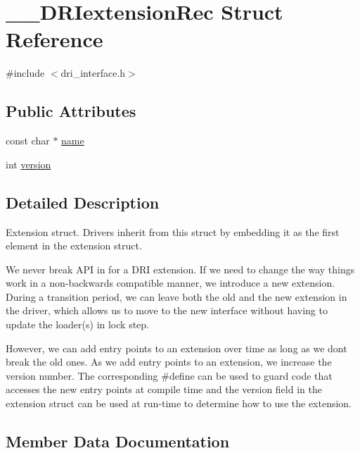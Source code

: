 \hypertarget{struct_____d_r_iextension_rec}{}\section{\+\_\+\+\_\+\+D\+R\+Iextension\+Rec Struct Reference}
\label{struct_____d_r_iextension_rec}


{\ttfamily \#include $<$dri\+\_\+interface.\+h$>$}

\subsection*{Public Attributes}
\begin{DoxyCompactItemize}
\item 
const char $\ast$ \hyperlink{struct_____d_r_iextension_rec_a477dbf3ee1bdd155ef7dda4896bb2540}{name}
\item 
int \hyperlink{struct_____d_r_iextension_rec_a6fa021bb0b66dbc662a4397a21ffa198}{version}
\end{DoxyCompactItemize}


\subsection{Detailed Description}
Extension struct. Drivers \textquotesingle{}inherit\textquotesingle{} from this struct by embedding it as the first element in the extension struct.

We never break A\+PI in for a D\+RI extension. If we need to change the way things work in a non-\/backwards compatible manner, we introduce a new extension. During a transition period, we can leave both the old and the new extension in the driver, which allows us to move to the new interface without having to update the loader(s) in lock step.

However, we can add entry points to an extension over time as long as we don\textquotesingle{}t break the old ones. As we add entry points to an extension, we increase the version number. The corresponding \#define can be used to guard code that accesses the new entry points at compile time and the version field in the extension struct can be used at run-\/time to determine how to use the extension. 

\subsection{Member Data Documentation}
\mbox{\label{struct_____d_r_iextension_rec_a477dbf3ee1bdd155ef7dda4896bb2540}} 
